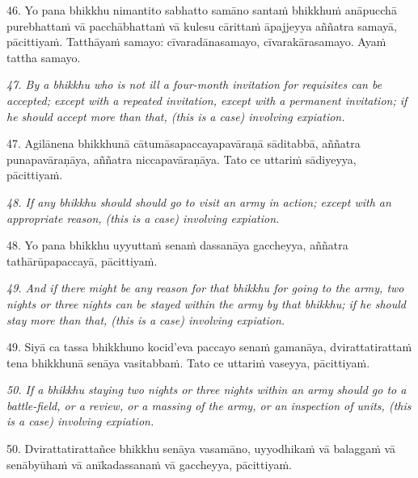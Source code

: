 \documentclass[11pt]{article}
\begin{document}
\begin{paracol}{2}
\begin{column}
\begin{flushleft}
46. Yo pana bhikkhu nimantito sabhatto samāno santaṁ bhikkhuṁ anāpucchā purebhattaṁ vā pacchābhattaṁ vā kulesu cārittaṁ āpajjeyya aññatra samayā, pācittiyaṁ. Tatthāyaṁ samayo: cīvaradānasamayo, cīvarakārasamayo. Ayaṁ tattha samayo.
\switchcolumn*
\end{flushleft}

{\itshape\footnotesize
47. By a bhikkhu who is not ill a four-month invitation for requisites can be accepted; except with a repeated invitation, except with a permanent invitation; if he should accept more than that, (this is a case) involving expiation.
}
\switchcolumn

\begin{flushleft}
47. Agilānena bhikkhunā cātumāsapaccayapavāraṇā sāditabbā, aññatra punapavāraṇāya, aññatra niccapavāraṇāya. Tato ce uttariṁ sādiyeyya, pācittiyaṁ.
\switchcolumn*
\end{flushleft}

{\itshape\footnotesize
48. If any bhikkhu should should go to visit an army in action; except with an appropriate reason, (this is a case) involving expiation.
}
\switchcolumn

\begin{flushleft}
48. Yo pana bhikkhu uyyuttaṁ senaṁ dassanāya gaccheyya, aññatra tathārūpapaccayā, pācittiyaṁ.
\switchcolumn*
\end{flushleft}

{\itshape\footnotesize
49. And if there might be any reason for that bhikkhu for going to the army, two nights or three nights can be stayed within the army by that bhikkhu; if he should stay more than that, (this is a case) involving expiation.
}
\switchcolumn

\begin{flushleft}
49. Siyā ca tassa bhikkhuno kocid’eva paccayo senaṁ gamanāya, dvirattatirattaṁ tena bhikkhunā senāya vasitabbaṁ. Tato ce uttariṁ vaseyya, pācittiyaṁ.
\switchcolumn*
\end{flushleft}

{\itshape\footnotesize
50. If a bhikkhu staying two nights or three nights within an army should go to a battle-field, or a review, or a massing of the army, or an inspection of units, (this is a case) involving expiation.
}
\switchcolumn

\begin{flushleft}
50. Dvirattatirattañce bhikkhu senāya vasamāno, uyyodhikaṁ vā balaggaṁ vā senābyūhaṁ vā anīkadassanaṁ vā gaccheyya, pācittiyaṁ.
\switchcolumn*
\end{flushleft}


\end{column}
\end{paracol}
\end{document}
